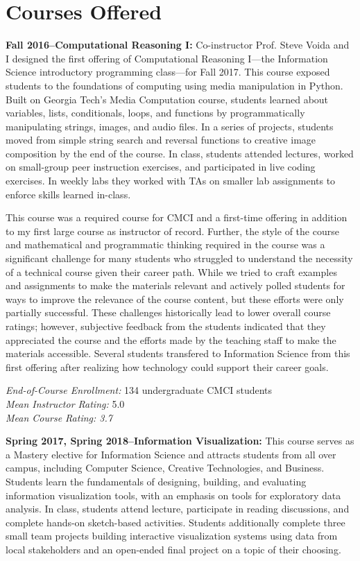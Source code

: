 \documentclass[11pt]{article}
\begin{document}
\section*{Courses Offered}

\textbf{Fall 2016--Computational Reasoning I: }
Co-instructor Prof. Steve Voida and I designed the first offering of Computational Reasoning I---the Information Science introductory programming class---for Fall 2017. This course exposed students to the foundations of computing using media manipulation in Python. Built on Georgia Tech's Media Computation course, students learned about variables, lists, conditionals, loops, and functions by programmatically manipulating strings, images, and audio files. In a series of projects, students moved from simple string search and reversal functions to creative image composition by the end of the course. In class, students attended lectures, worked on small-group peer instruction exercises, and participated in live coding exercises. In weekly labs they worked with TAs on smaller lab assignments to enforce skills learned in-class.

This course was a required course for CMCI and a first-time offering in addition to my first large course as instructor of record. Further, the style of the course and mathematical and programmatic thinking required in the course was a significant challenge for many students who struggled to understand the necessity of a technical course given their career path. While we tried to craft examples and assignments to make the materials relevant and actively polled students for ways to improve the relevance of the course content, but these efforts were only partially successful.
These challenges historically lead to lower overall course ratings; however, subjective feedback from the students indicated that they appreciated the course and the efforts made by the teaching staff to make the materials accessible. Several students transfered to Information Science from this first offering after realizing how technology could support their career goals. 

\emph{End-of-Course Enrollment: }134 undergraduate CMCI students\\
\emph{Mean Instructor Rating:} 5.0\\
\emph{Mean Course Rating: 3.7} 

\textbf{Spring 2017, Spring 2018--Information Visualization: } 
This course serves as a Mastery elective for Information Science and attracts students from all over campus, including Computer Science, Creative Technologies, and Business. Students learn the fundamentals of designing, building, and evaluating information visualization tools, with an emphasis on tools for exploratory data analysis. In class, students attend lecture, participate in reading discussions, and complete hands-on sketch-based activities. Students additionally complete three small team projects building interactive visualization systems using data from local stakeholders and an open-ended final project on a topic of their choosing. 
\end{document}
